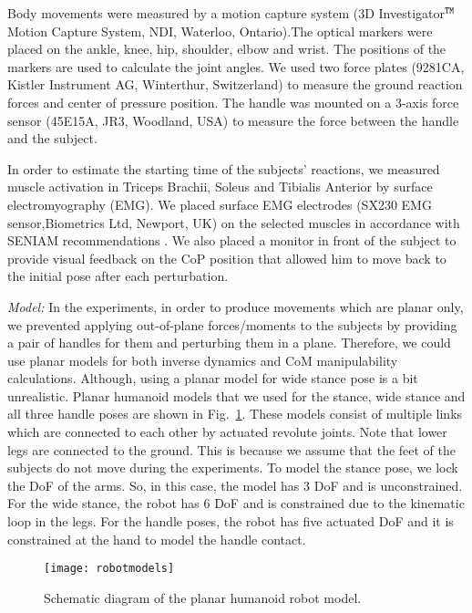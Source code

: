 Body movements were measured by a motion capture system (3D Investigator$^{\tt\small TM}$ Motion Capture System, NDI, Waterloo, Ontario).The optical markers were placed on the ankle, knee, hip, shoulder, elbow and wrist. The positions of the markers are used to calculate the joint angles. We used two force plates (9281CA, Kistler Instrument AG, Winterthur, Switzerland) to measure the ground reaction forces and center of pressure position. The handle was mounted on a 3-axis force sensor (45E15A, JR3, Woodland, USA) to measure the force between the handle and the subject.

In order to estimate the starting time of the subjects' reactions, we measured muscle activation in Triceps Brachii, Soleus and Tibialis Anterior by surface electromyography (EMG). We placed surface EMG electrodes (SX230 EMG sensor,Biometrics Ltd, Newport, UK) on the selected muscles in accordance with SENIAM recommendations \cite{Hermensetal99}. We also placed a monitor in front of the subject to provide visual feedback on the CoP position that allowed him to move back to the initial pose after each perturbation.


\textit{Model:} In the experiments, in order to produce movements which are planar only, we prevented applying out-of-plane forces/moments to the subjects by providing a pair of handles for them and perturbing them in a plane. Therefore, we could use planar models for both inverse dynamics and CoM manipulability calculations. Although, using a planar model for wide stance pose is a bit unrealistic. Planar humanoid models that we used for the stance, wide stance and all three handle poses are shown in Fig.~\ref{planarhumanoids}. These models consist of multiple links which are connected to each other by actuated revolute joints. Note that lower legs are connected to the ground. This is because we assume that the feet of the subjects do not move during the experiments. To model the stance pose, we lock the DoF of the arms. So, in this case, the model has 3 DoF and is unconstrained. For the wide stance, the robot has 6 DoF and is constrained due to the kinematic loop in the legs. For the handle poses, the robot has five actuated DoF and it is constrained at the hand to model the handle contact.
\begin{figure}
	\centering \texttt{[image: robotmodels]}
	\caption{Schematic diagram of the planar humanoid robot model.}
	\label{planarhumanoids}
\end{figure}

